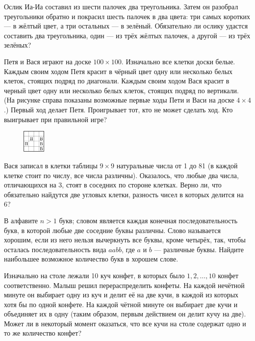 \documentclass{article}
\begin{document}
\begin{enumerate_boxed}
        \item  Ослик Иа-Иа составил из шести палочек два треугольника.
        Затем он разобрал треугольники обратно и покрасил шесть палочек в два цвета: три самых коротких — в жёлтый цвет, а три остальных — в зелёный.
        Обязательно ли ослику удастся составить два треугольника, один — из трёх жёлтых палочек, а другой — из трёх зелёных?

        \item Петя и Вася играют на доске $100 \times 100$.
        Изначально все клетки доски белые.
        Каждым своим ходом Петя красит в чёрный цвет одну или несколько белых клеток, стоящих подряд по диагонали.
        Каждым своим ходом Вася красит в черный цвет одну или несколько белых клеток, стоящих подряд по вертикали.
        (На рисунке справа показаны возможные первые ходы Пети и Васи на доске $4 \times 4$.) Первый ход делает Петя.
        Проигрывает тот, кто не может сделать ход.
        Кто выигрывает при правильной игре?

        \begin{figure}[h]
            \centering
            \includegraphics[width=0.1\textwidth]{table}\label{fig:table}
        \end{figure}

        \item Вася записал в клетки таблицы $9 \times 9$ натуральные числа от 1 до 81 (в каждой клетке стоит по числу, все числа различны).
        Оказалось, что любые два числа, отличающихся на 3, стоят в соседних по стороне клетках.
        Верно ли, что обязательно найдутся две угловых клетки, разность чисел в которых делится на 6?

        \item В алфавите $n > 1$ букв; словом является каждая конечная последовательность букв, в которой любые две соседние буквы различны.
        Слово называется хорошим, если из него нельзя вычеркнуть все буквы, кроме четырёх, так, чтобы осталась последовательность вида $aabb$, где $a$ и $b$ — различные буквы.
        Найдите наибольшее возможное количество букв в хорошем слове.

        \item Изначально на столе лежали 10 куч конфет, в которых было $1, 2, \dotsc, 10$ конфет соответственно.
        Малыш решил перераспределить конфеты.
        На каждой нечётной минуте он выбирает одну из куч и делит её на две кучи, в каждой из которых хотя бы по одной конфете.
        На каждой чётной минуте он выбирает две кучи и объединяет их в одну (таким образом, первым действием он делит кучу на две).
        Может ли в некоторый момент оказаться, что все кучи на столе содержат одно и то же количество конфет?


\end{enumerate_boxed}
\end{document}
